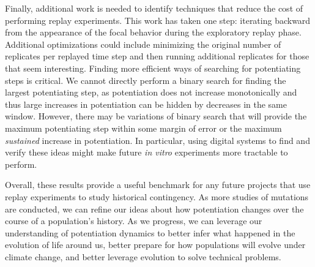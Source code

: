 Finally, additional work is needed to identify techniques that reduce the cost of performing replay experiments. 
This work has taken one step: iterating backward from the appearance of the focal behavior during the exploratory replay phase. 
Additional optimizations could include minimizing the original number of replicates per replayed time step and then running additional replicates for those that seem interesting. 
Finding more efficient ways of searching for potentiating steps is critical. 
We cannot directly perform a binary search for finding the largest potentiating step, as potentiation does not increase monotonically and thus large increases in potentiation can be hidden by decreases in the same window. 
However, there may be variations of binary search that will provide the maximum potentiating step within some margin of error or the maximum \textit{sustained} increase in potentiation. 
In particular, using digital systems to find and verify these ideas might make future \textit{in vitro} experiments more tractable to perform. 

Overall, these results provide a useful benchmark for any future projects that use replay experiments to study historical contingency. 
As more studies of mutations are conducted, we can refine our ideas about how potentiation changes over the course of a population's history. 
As we progress, we can leverage our understanding of potentiation dynamics to better infer what happened in the evolution of life around us, better prepare for how populations will evolve under climate change, and better leverage evolution to solve technical problems. 